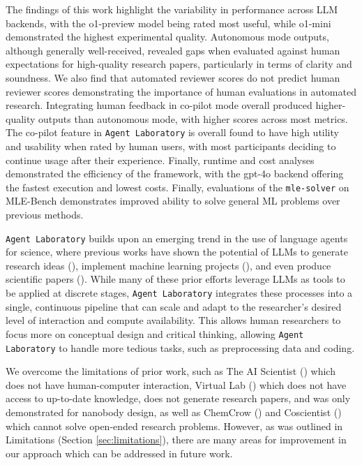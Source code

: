 \documentclass[11pt, a4paper]{gdm_format}
\begin{document}
The findings of this work highlight the variability in performance across LLM backends, with the o1-preview model being rated most useful, while o1-mini demonstrated the highest experimental quality. Autonomous mode outputs, although generally well-received, revealed gaps when evaluated against human expectations for high-quality research papers, particularly in terms of clarity and soundness. We also find that automated reviewer scores do not predict human reviewer scores demonstrating the importance of human evaluations in automated research. Integrating human feedback in co-pilot mode overall produced higher-quality outputs than autonomous mode, with higher scores across most metrics. The co-pilot feature in \texttt{Agent Laboratory} is overall found to have high utility and usability when rated by human users, with most participants deciding to continue usage after their experience. Finally, runtime and cost analyses demonstrated the efficiency of the framework, with the gpt-4o backend offering the fastest execution and lowest costs. Finally, evaluations of the \texttt{mle-solver} on MLE-Bench demonstrates improved ability to solve general ML problems over previous methods.



\texttt{Agent Laboratory} builds upon an emerging trend in the use of language agents for science, where previous works have shown the potential of LLMs to generate research ideas (\cite{baek2024researchagent, si2024can, li2024chain}), implement machine learning projects (\cite{chan2024mle, jing2024dsbench, huang2024mlagentbench}), and even produce scientific papers (\cite{lu2024aiscientist}). While many of these prior efforts leverage LLMs as tools to be applied at discrete stages, \texttt{Agent Laboratory} integrates these processes into a single, continuous pipeline that can scale and adapt to the researcher’s desired level of interaction and compute availability. This allows human researchers to focus more on conceptual design and critical thinking, allowing \texttt{Agent Laboratory} to handle more tedious tasks, such as preprocessing data and coding.


We overcome the limitations of prior work, such as The AI Scientist (\cite{lu2024aiscientist}) which does not have human-computer interaction, Virtual Lab (\cite{swanson2024virtual}) which does not have access to up-to-date knowledge, does not generate research papers, and was only demonstrated for nanobody design, as well as ChemCrow (\cite{m2024augmenting}) and Coscientist (\cite{boiko2023autonomous}) which cannot solve open-ended research problems. However, as was outlined in Limitations (Section \ref{sec:limitations}), there are many areas for improvement in our approach which can be addressed in future work. 
\end{document}
